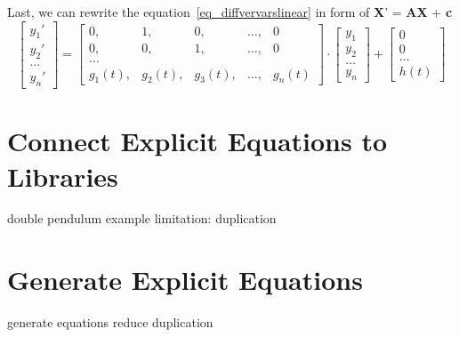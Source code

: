 Last, we can rewrite the equation~\ref{eq_diffvervarslinear} in form of \textbf{X}' = \textbf{AX} + \textbf{c}
\begin{equation}
	\begin{bmatrix}
		y_{1}' \\
        y_{2}' \\
        \dots  \\
        y_{n}'
	\end{bmatrix}
    = 
    \begin{bmatrix}
		0, & 1, & 0, & \dots, & 0 \\
        0, & 0, & 1, & \dots, & 0 \\
        \dots \\
        g_{1}(t), & g_{2}(t), & g_{3}(t), & \dots, & g_{n}(t)
	\end{bmatrix}
    \cdot
    \begin{bmatrix}
		y_{1} \\
        y_{2} \\
        \dots  \\
        y_{n}
	\end{bmatrix}
    + 
    \begin{bmatrix}
		0 \\
        0 \\
        \dots  \\
        h(t)
	\end{bmatrix}
\end{equation}

\section{Connect Explicit Equations to Libraries}
\label{se_connecteetolib}
double pendulum example
limitation: duplication

\section{Generate Explicit Equations}
generate equations
reduce duplication

